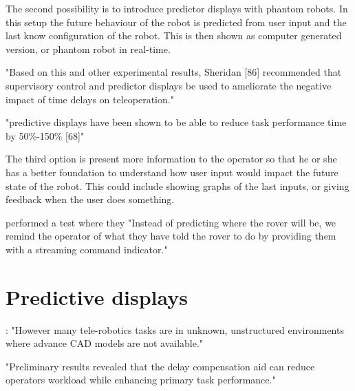 The second possibility is to introduce predictor displays with phantom robots. In this setup the future behaviour of the robot is predicted from user input and the last know configuration of the robot. This is then shown as computer generated version, or phantom robot in real-time.

\citep{Chen2007} "Based on this and other experimental results, Sheridan [86] recommended that supervisory control and predictor displays be used to ameliorate the negative impact of time delays on teleoperation."

"predictive displays have been shown to be able to reduce task performance time by 50\%-150\% [68]"

The third option is present more information to the operator so that he or she has a better foundation to understand how user input would impact the future state of the robot. This could include showing graphs of the last inputs, or giving feedback when the user does something.

\citep{Miller2005} performed a test where they "Instead of predicting where the rover will be, we remind the operator of what they have told the rover to do by providing them with a streaming command indicator."


\section{Predictive displays}


\citep{Hu2015}: "However many tele-robotics tasks are in unknown, unstructured environments where advance CAD models are not available."

\citep{Lu2018} "Preliminary results revealed that the delay compensation aid can reduce operators workload while enhancing primary task performance."


